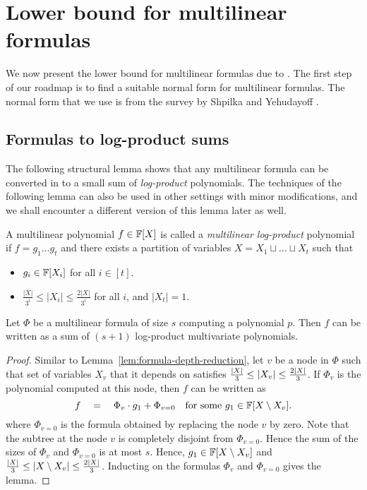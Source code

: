 \section{Lower bound for multilinear formulas}
	We now present the lower bound for multilinear formulas due 
	to \cite{raz2004}. The first step of our roadmap is to find 
	a suitable normal form for multilinear formulas. The normal 
	form that we use is from the survey by Shpilka and 
	Yehudayoff \cite{sy}. 	

\subsection{Formulas to log-product sums}

The following structural lemma shows that any multilinear formula can be converted in to a small sum of \emph{log-product} polynomials. The techniques of the following lemma can also be used in other settings with minor modifications, and we shall encounter a different version of this lemma later as well.

\begin{definition}\label{defn:mult-logproduct}
  A multilinear polynomial $f\in \mathbb{F}[X]$ is called a \emph{multilinear log-product} polynomial if $f = g_1\dots g_t$ and there exists a partition of variables $X = X_1 \sqcup \dots \sqcup X_t$ such that
  \begin{itemize}
  \item $g_i \in \mathbb{F}[X_i]$ for all $i \in [t]$.
  \item $\frac{|X|}{3^i} \leq |X_i| \leq \frac{2|X|}{3^i}$ for all
    $i$, and $|X_t| = 1$.
  \end{itemize}
\end{definition}

\begin{lemma}\label{lem:mult-logproduct}
  Let $\Phi$ be a multilinear formula of size $s$ computing a polynomial $p$. Then $f$ can be written as a sum of $(s+1)$ log-product multivariate polynomials.
\end{lemma}
\begin{proof}
  Similar to Lemma~\ref{lem:formula-depth-reduction}, let $v$ be a node in $\Phi$ such that set of variables $X_v$ that it depends on satisfies $\frac{|X|}{3} \leq \left|X_v\right| \leq \frac{2|X|}{3}$. If $\Phi_v$ is the polynomial computed at this node, then $f$ can be written as
  $$
  f \quad = \quad \Phi_v \cdot g_1 + \Phi_{v=0} \quad\text{for some $g_1 \in \mathbb{F}[X\setminus X_v]$}.
  $$
  where $\Phi_{v=0}$ is the formula obtained by replacing the node $v$ by zero. Note that the subtree at the node $v$ is completely disjoint from $\Phi_{v=0}$. Hence the sum of the sizes of $\Phi_v$ and $\Phi_{v=0}$ is at most $s$. Hence, $g_1 \in \mathbb{F}[X\setminus X_v]$ and $\frac{|X|}{3} \leq \left|X \setminus X_v\right| \leq \frac{2|X|}{3}$. Inducting on the formulas $\Phi_v$ and $\Phi_{v=0}$ gives the lemma.
\end{proof}

